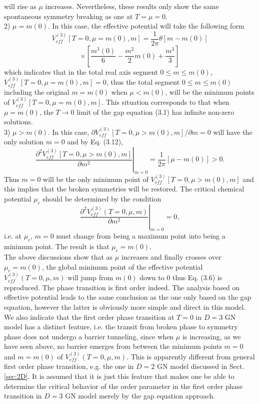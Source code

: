 \documentclass[a4paper,eqsecnum]{revtex4}
\begin{document}
will rise as $\mu$ increases. Nevertheless, these results only show the same spontaneous symmetry breaking as one at $T=\mu=0$.\\
2) $\mu=m(0)$. In this case, the effective potential will take the following form
\[
V_{eff}^{(3)}[T=0,\mu=m(0),m]=\frac{1}{2\pi}\theta[m-m(0)]
\]
\begin{equation}
\times\left[\frac{m^3(0)}{6}-\frac{m^2}{2}m(0)+\frac{m^3}{3}\right]
\end{equation}%
which indicates that in the total real axis segment $0\leq m\leq m(0)$,
$V_{eff}^{(3)}[T=0,\mu=m(0),m]=0$, thus the total segment $0\leq m\leq m(0)$ 
including the original $m=m(0)$ when $\mu<m(0)$, will be the minimum points of
$V_{eff}^{(3)}[T=0,\mu=m(0),m]$. This situation corresponds to that when 
$\mu=m(0)$, the $T\to 0$ limit of the gap equation (3.1) has infinite non-zero 
solutions.\\
3) $\mu>m(0)$. In this case, $\partial V_{eff}^{(3)}[T=0,\mu>m(0),m]/\partial m=0$
 will have the only solution $m=0$ and by Eq. (3.12),
\begin{equation}
\left.\frac{\partial^2 V_{eff}^{(3)}[T=0,\mu>m(0),m]}{\partial m^2}\right|_{m=0}
=\frac{1}{2\pi}[\mu-m(0)]>0.
\end{equation}%
Thus $m=0$ will be the only minimum point of $V_{eff}^{(3)}[T=0,\mu>m(0),m]$ and this 
implies that the broken symmetries will be restored. The critical chemical potential 
$\mu_c$ should be determined by the condition
\begin{equation}
\left.\frac{\partial^2 V_{eff}^{(3)}(T=0,\mu,m)}{\partial m^2}\right|_{m=0}=0,
\end{equation}%
i.e. at $\mu_c$, $m=0$ must change from being a maximum point into being a minimum point.  The result is that $\mu_c=m(0)$.\\
\indent The above discussions show that as $\mu$ increases and finally crosses over 
$\mu_c=m(0)$, the global minimum point of the effective potential 
$V_{eff}^{(3)}(T=0,\mu,m)$ will jump from $m(0)$ down to 0 thus Eq. (3.6) is 
reproduced. The phase transition is first order indeed. The analysis based on effective potential leads to the same conclusion as the one only based on the gap equation, however the latter is obviously more simple and direct in this model. We
also indicate that the first order phase transition at $T=0$ in $D=3$ GN model has 
a distinct feature, i.e. the transit from broken phase to symmetry phase does not 
undergo a barrier tunneling, since when $\mu$ is increasing, as we have seen above, 
no barrier emerges from between the minimum points $m=0$ and $m=m(0)$ of 
$V_{eff}^{(3)}(T=0,\mu,m)$. This is apparently different from general first order 
phase transition, e.g. the one in $D=2$ GN model discussed in Sect. \ref{sec:2D}. 
It is assumed that it is just this feature that makes one be able to determine the 
critical behavior of the order parameter in the first order phase transition in $D=3$ 
GN model merely by the gap equation approach. 
\end{document}
